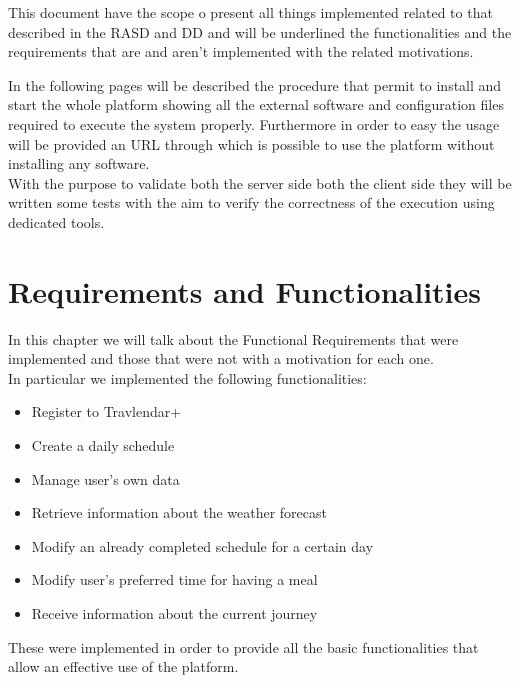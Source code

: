 \documentclass[numbers=noenddot, 12pt, a4paper, oneside]{scrbook}
\begin{document}
This document have the scope o present all things implemented related to that described in the RASD and DD and will be underlined the functionalities and the requirements that are and aren't implemented with the related motivations. \\\newline

In the following pages will be described the procedure that permit to install and start the whole platform showing all the external software and configuration files required to execute the system properly.
Furthermore in order to easy the usage will be provided an URL through which is possible to use the platform without installing any software. \\\newline
With the purpose to validate both the server side both the client side they will be written some tests with the aim to verify the correctness of the execution using dedicated tools. \\\newpage


\chapter{Requirements and Functionalities}

In this chapter we will talk about the Functional Requirements that were implemented and those that were not with a motivation for each one.\\

In particular we implemented the following functionalities:
\begin{itemize}
	\item Register to Travlendar+
	\item Create a daily schedule
	\item Manage user's own data
	\item Retrieve information about the weather forecast
	\item Modify an already completed schedule for a certain day
	\item Modify user's preferred time for having a meal
	\item Receive information about the current journey
\end{itemize}

These were implemented in order to provide all the basic functionalities that allow an effective use of the platform.\\\newline
\end{document}

